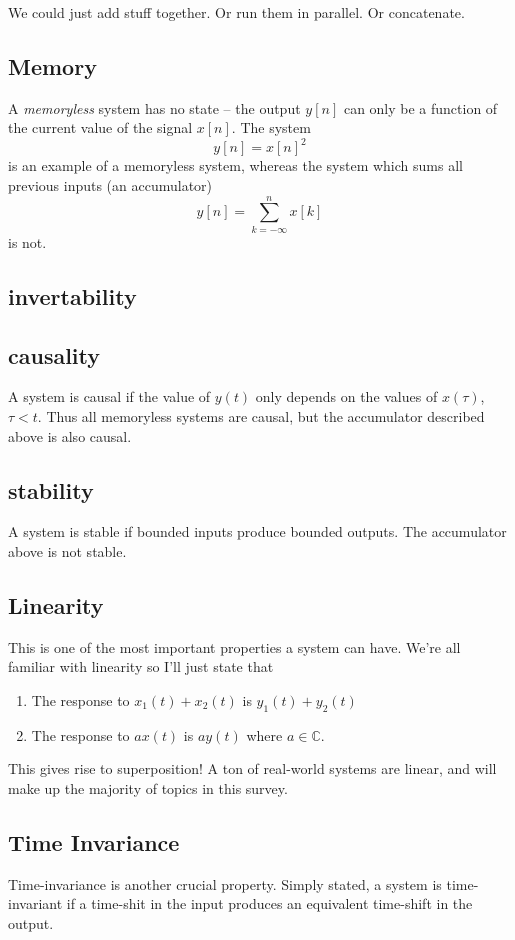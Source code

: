 We could just add stuff together. Or run them in parallel. Or concatenate. 



\subsection{Memory}
A \textit{memoryless} system has no state -- the output $y[n]$ can only be a function
of the current value of the signal $x[n]$. The system 
\[
y[n] = x[n]^2
\]
is an example of a memoryless system, whereas the system which sums all previous
inputs (an accumulator) 
\[
y[n] = \sum_{k=-\infty}^n x[k]
\]
is not. 


\subsection{invertability}

\subsection{causality}
A system is causal if the value of $y(t)$ only depends on the values
of $x(\tau)$, $\tau < t$. Thus all memoryless systems are causal, 
but the accumulator described above is also causal. 


\subsection{ stability }
A system is stable if bounded inputs produce bounded outputs. The accumulator
above is not stable. 

\subsection{Linearity}
This is one of the most important properties a system can have. We're
all familiar with linearity so I'll just state that 
\begin{enumerate}
\item The response to $x_1(t) + x_2(t)$ is $y_1(t) + y_2(t)$
\item The response to $a x(t)$ is $a y(t)$ where $a \in \mathbb{C}$. 
\end{enumerate}

This gives rise to superposition! A ton of real-world systems are linear, 
and will make up the majority of topics in this survey. 

\subsection{Time Invariance}
Time-invariance is another crucial property. Simply stated, a
system is time-invariant if a time-shit in the input
produces an equivalent time-shift in the output. 

